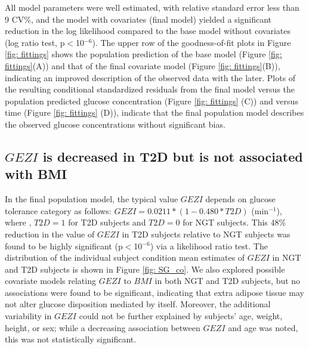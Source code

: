 \documentclass[utf8]{frontiersSCNS} %
\begin{document}
All model parameters were well estimated, with relative standard error less than 9 CV\%, and the model with covariates (final model) yielded a significant reduction in the log likelihood compared to the base model without covariates (log ratio test, p$<$10$^{-6}$). The upper row of the goodness-of-fit plots in Figure \ref{fig: fittings} shows the population prediction of the base model (Figure \ref{fig: fittings}(A)) and that of the final covariate model (Figure \ref{fig: fittings}(B)), indicating an improved description of the observed data with the later. Plots of the resulting conditional standardized residuals from the final model versus the population predicted glucose concentration (Figure \ref{fig: fittings} (C)) and versus time (Figure \ref{fig: fittings} (D)), indicate that the final population model describes the observed glucose concentrations without significant bias.

\vskip 0.5cm
\subsection{$GEZI$ is decreased in T2D but is not associated with BMI}
In the final population model, the typical value $GEZI$ depends on glucose tolerance category as follows: $GEZI=0.0211*(1-0.480*T2D)$ (min$^{-1}$), where , $T2D=1$ for T2D subjects and $T2D=0$ for NGT subjects. This 48\% reduction in the value of $GEZI$ in T2D subjects relative to NGT subjects was found to be highly significant (p$<$10$^{-6}$) via a likelihood ratio test. The distribution of the individual subject condition mean estimates of $GEZI$ in NGT and T2D subjects is shown in Figure \ref{fig: SG_co}. We also explored possible covariate models relating $GEZI$ to $BMI$ in both NGT and T2D subjects, but no associations were found to be significant, indicating that extra adipose tissue may not alter glucose disposition mediated by itself. Moreover, the additional variability in $GEZI$ could not be further explained by subjects’ age, weight, height, or sex; while a decreasing association between $GEZI$ and age was noted, this was not statistically significant.
\end{document}
